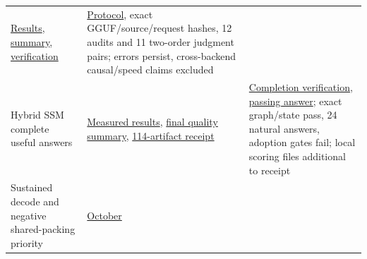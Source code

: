 \documentclass[10pt,a4paper]{article}
\begin{document}
\begin{longtable}[]{@{}lll@{}}
\begin{minipage}[t]{0.30\columnwidth}
\href{https://github.com/MoyaMryia/riscv-accl/blob/main/spacemit/reports/2026-10-06-local-clean-reference-results.md}{Results},
\href{https://github.com/MoyaMryia/riscv-accl/blob/main/spacemit/reports/raw/local-reference-quality-20261006-194015/summary.json}{summary},
\href{https://github.com/MoyaMryia/riscv-accl/blob/main/spacemit/reports/raw/local-reference-quality-20261006-194015/completion-verification.json}{verification}\strut
\end{minipage} & \begin{minipage}[t]{0.30\columnwidth}\raggedright
\href{https://github.com/MoyaMryia/riscv-accl/blob/main/spacemit/experiments/2026-10-06-local-clean-reference.md}{Protocol},
exact GGUF/source/request hashes, 12 audits and 11 two-order judgment
pairs; errors persist, cross-backend causal/speed claims excluded\strut
\end{minipage}\tabularnewline
\begin{minipage}[t]{0.30\columnwidth}\raggedright
Hybrid SSM complete useful answers\strut
\end{minipage} & \begin{minipage}[t]{0.30\columnwidth}\raggedright
\href{https://github.com/MoyaMryia/riscv-accl/blob/main/spacemit/reports/2026-10-06-ssm-complete-answer-results.md}{Measured
results},
\href{https://github.com/MoyaMryia/riscv-accl/blob/main/spacemit/reports/raw/k1-ssm-quality-20261006-131234/ssm-quality-summary.json}{final
quality summary},
\href{https://github.com/MoyaMryia/riscv-accl/blob/main/spacemit/reports/raw/k1-ssm-quality-20261006-131234/collection-receipt.json}{114-artifact
receipt}\strut
\end{minipage} & \begin{minipage}[t]{0.30\columnwidth}\raggedright
\href{https://github.com/MoyaMryia/riscv-accl/blob/main/spacemit/reports/raw/k1-ssm-quality-20261006-131234/completion-verification.json}{Completion
verification},
\href{https://github.com/MoyaMryia/riscv-accl/blob/main/spacemit/reports/2026-10-06-ssm-useful-answer-example.md}{passing
answer}; exact graph/state pass, 24 natural answers, adoption gates
fail; local scoring files additional to receipt\strut
\end{minipage}\tabularnewline
\begin{minipage}[t]{0.30\columnwidth}\raggedright
Sustained decode and negative shared-packing priority\strut
\end{minipage} & \begin{minipage}[t]{0.30\columnwidth}\raggedright
\href{https://github.com/MoyaMryia/riscv-accl/blob/main/spacemit/reports/2026-10-07-decode-packing-results.md}{October
}
\end{minipage}
\end{longtable}
\end{document}
